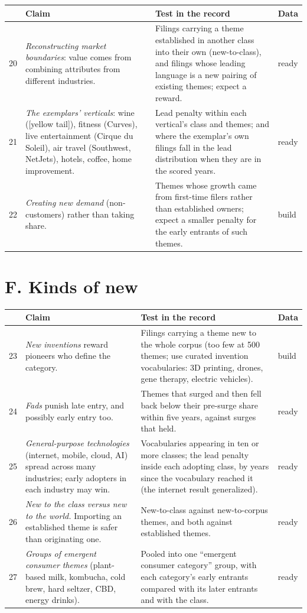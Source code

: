 \begin{longtable}{p{0.4cm}p{5.3cm}p{6.2cm}p{1.5cm}}
\toprule
& Claim & Test in the record & Data \\
\midrule
\endhead
20 & \emph{Reconstructing market boundaries}: value comes from combining
attributes from different industries. & Filings carrying a theme
established in another class into their own (new-to-class), and
filings whose leading language is a new pairing of existing themes;
expect a reward. & ready \\
21 & \emph{The exemplars' verticals}: wine ([yellow tail]), fitness
(Curves), live entertainment (Cirque du Soleil), air travel (Southwest,
NetJets), hotels, coffee, home improvement. & Lead penalty within each
vertical's class and themes; and where the exemplar's own filings fall
in the lead distribution when they are in the scored years. & ready \\
22 & \emph{Creating new demand} (non-customers) rather than taking share.
& Themes whose growth came from first-time filers rather than
established owners; expect a smaller penalty for the early entrants of
such themes. & build \\
\bottomrule
\end{longtable}

\section*{F. Kinds of new}

\begin{longtable}{p{0.4cm}p{5.3cm}p{6.2cm}p{1.5cm}}
\toprule
& Claim & Test in the record & Data \\
\midrule
\endhead
23 & \emph{New inventions} reward pioneers who define the category. &
Filings carrying a theme new to the whole corpus (too few at 500 themes;
use curated invention vocabularies: 3D printing, drones, gene therapy,
electric vehicles). & build \\
24 & \emph{Fads} punish late entry, and possibly early entry too. &
Themes that surged and then fell back below their pre-surge share
within five years, against surges that held. & ready \\
25 & \emph{General-purpose technologies} (internet, mobile, cloud, AI)
spread across many industries; early adopters in each industry may
win. & Vocabularies appearing in ten or more classes; the lead penalty
inside each adopting class, by years since the vocabulary reached it
(the internet result generalized). & ready \\
26 & \emph{New to the class versus new to the world.} Importing an
established theme is safer than originating one. & New-to-class against
new-to-corpus themes, and both against established themes. & ready \\
27 & \emph{Groups of emergent consumer themes} (plant-based milk,
kombucha, cold brew, hard seltzer, CBD, energy drinks). & Pooled into
one ``emergent consumer category'' group, with each category's early
entrants compared with its later entrants and with the class. & ready \\
\bottomrule
\end{longtable}

